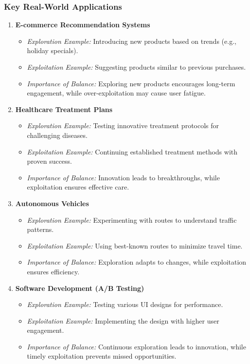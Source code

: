 \documentclass[aspectratio=169]{beamer}
\begin{document}
\begin{frame}[fragile]
  \frametitle{Key Real-World Applications}
  \begin{enumerate}
    \item \textbf{E-commerce Recommendation Systems}
      \begin{itemize}
        \item \textit{Exploration Example:} Introducing new products based on trends (e.g., holiday specials).
        \item \textit{Exploitation Example:} Suggesting products similar to previous purchases.
        \item \textit{Importance of Balance:} Exploring new products encourages long-term engagement, while over-exploitation may cause user fatigue.
      \end{itemize}
    
    \item \textbf{Healthcare Treatment Plans}
      \begin{itemize}
        \item \textit{Exploration Example:} Testing innovative treatment protocols for challenging diseases.
        \item \textit{Exploitation Example:} Continuing established treatment methods with proven success.
        \item \textit{Importance of Balance:} Innovation leads to breakthroughs, while exploitation ensures effective care.
      \end{itemize}
    
    \item \textbf{Autonomous Vehicles}
      \begin{itemize}
        \item \textit{Exploration Example:} Experimenting with routes to understand traffic patterns.
        \item \textit{Exploitation Example:} Using best-known routes to minimize travel time.
        \item \textit{Importance of Balance:} Exploration adapts to changes, while exploitation ensures efficiency.
      \end{itemize}
    
    \item \textbf{Software Development (A/B Testing)}
      \begin{itemize}
        \item \textit{Exploration Example:} Testing various UI designs for performance.
        \item \textit{Exploitation Example:} Implementing the design with higher user engagement.
        \item \textit{Importance of Balance:} Continuous exploration leads to innovation, while timely exploitation prevents missed opportunities.
      \end{itemize}
  \end{enumerate}
\end{frame}
\end{document}
